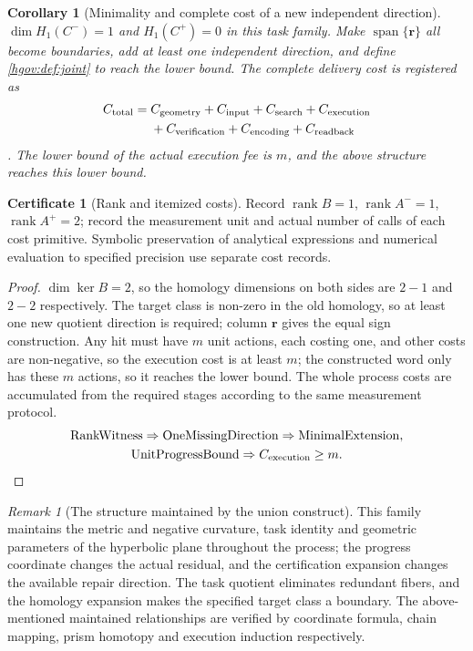 \documentclass[12pt,a4paper,openany,notitlepage]{report}
\theoremstyle{plain}
\newtheorem{corollary}[theorem]{Corollary}
\theoremstyle{definition}
\newtheorem*{certificate}{Certificate}
\theoremstyle{remark}
\newtheorem{remark}[theorem]{Remark}
\begin{document}
\begin{CJK*}
\begin{corollary}
[Minimality and complete cost of a new independent direction]\label{hgov:cor:jointcost}
$\dim H_1(C^-)=1$ and $H_1(C^+)=0$ in this task family. Make $\operatorname{span}\{\mathbf r\}$ all become boundaries, add at least one independent direction, and define \ref{hgov:def:joint} to reach the lower bound. The complete delivery cost is registered as \[
\begin{aligned}
C_{\rm total}={}&C_{\rm geometry}+C_{\rm input}+C_{\rm search}
+C_{\rm execution}\\
&+C_{\rm verification}+C_{\rm encoding}+C_{\rm readback}
\end{aligned}
\]. The lower bound of the actual execution fee is $m$, and the above structure reaches this lower bound.\end{corollary}
\begin{certificate}
[Rank and itemized costs]Record $\operatorname{rank}B=1$, $\operatorname{rank}A^-=1$, $\operatorname{rank}A^+=2$; record the measurement unit and actual number of calls of each cost primitive. Symbolic preservation of analytical expressions and numerical evaluation to specified precision use separate cost records.\end{certificate}
\begin{proof}
$\dim\ker B=2$, so the homology dimensions on both sides are $2-1$ and $2-2$ respectively. The target class is non-zero in the old homology, so at least one new quotient direction is required; column $\mathbf r$ gives the equal sign construction. Any hit must have $m$ unit actions, each costing one, and other costs are non-negative, so the execution cost is at least $m$; the constructed word only has these $m$ actions, so it reaches the lower bound. The whole process costs are accumulated from the required stages according to the same measurement protocol. \begin{gather*}
\operatorname{RankWitness}
\Rightarrow\operatorname{OneMissingDirection}
\Rightarrow\operatorname{MinimalExtension},\\
\operatorname{UnitProgressBound}\Rightarrow C_{\rm execution}\ge m .\qedhere
\end{gather*}\end{proof}


\begin{remark}
[The structure maintained by the union construct]This family maintains the metric and negative curvature, task identity and geometric parameters of the hyperbolic plane throughout the process; the progress coordinate changes the actual residual, and the certification expansion changes the available repair direction. The task quotient eliminates redundant fibers, and the homology expansion makes the specified target class a boundary. The above-mentioned maintained relationships are verified by coordinate formula, chain mapping, prism homotopy and execution induction respectively.\end{remark}



\end{CJK*}
\end{document}
